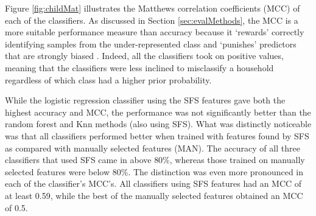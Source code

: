 Figure \ref{fig:childMat} illustrates the Matthews correlation coefficients (MCC) of each of the classifiers.  As discussed in Section \ref{sec:evalMethods}, the MCC is a more suitable performance measure than accuracy because it `rewards' correctly identifying samples from the under-represented class and `punishes' predictors that are strongly biased \cite{Beckel_3}. Indeed, all the classifiers took on positive values, meaning that the classifiers were less inclined to misclassify a household regardless of which class had a higher prior probability. 

While the logistic regression classifier using the SFS features gave both the highest accuracy and MCC, the performance was not significantly better than the random forest and Knn methods (also using SFS). What was distinctly noticeable was that all classifiers performed better when trained with features found by SFS as compared with manually selected features (MAN).  The accuracy of all three classifiers that used SFS came in above 80\%, whereas those trained on manually selected features were below 80\%. The distinction was even more pronounced in each of the classifier's MCC's.  All classifiers using SFS features had an MCC of at least 0.59, while the best of the manually selected features obtained an MCC of 0.5.  %

